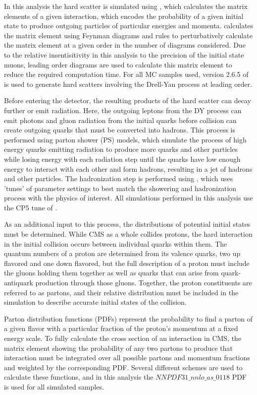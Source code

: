In this analysis the hard scatter is simulated using \mg, which calculates the matrix elements of a given interaction, which encodes the probability of a given initial state to produce outgoing particles of particular energies and momenta.
\mg calculates the matrix element using Feynman diagrams and rules to perturbatively calculate the matrix element at a given order in the number of diagrams considered.
Due to the relative insentisitivity in this analysis to the precision of the initial state muons, leading order diagrams are used to calculate this matrix element to reduce the required computation time.
For all MC samples used, version 2.6.5 of \mg is used to generate hard scatters involving the Drell-Yan process at leading order. 

Before entering the detector, the resulting products of the hard scatter can decay further or emit radiation.
Here, the outgoing leptons from the DY process can emit photons and gluon radiation from the initial quarks before collision can create outgoing quarks that must be converted into hadrons. 
This process is performed using parton shower (PS) models, which simulate the process of high energy quarks emitting radiation to produce more quarks and other particles while losing energy with each radiation step until the quarks have low enough energy to interact with each other and form hadrons, resulting in a jet of hadrons and other particles.
The hadronization step is performed using \pythia, which uses 'tunes' of parameter settings to best match the showering and hadronization process with the physics of interest. 
All simulations performed in this analysis use the CP5 tune of \pythia \cite{pythia_tune}. 

As an additional input to this process, the distributions of potential initial states must be determined.
While CMS as a whole collides protons, the hard interaction in the initial collision occurs between individual quarks within them.
The quantum numbers of a proton are determined from its valence quarks, two up flavored and one down flavored, but the full description of a proton must include the gluons holding them together as well as quarks that can arise from quark-antiquark production through those gluons. 
Together, the proton constituents are referred to as partons, and their relative distribution must be included in the simulation to describe accurate initial states of the collision.

Parton distribution functions (PDFs) represent the probability to find a parton of a given flavor with a particular fraction of the proton's momentum at a fixed energy scale.
To fully calculate the cross section of an interaction in CMS, the matrix element showing the probability of any two partons to produce that interaction must be integrated over all possible partons and momentum fractions and weighted by the corresponding PDF. 
Several different schemes are used to calculate these functions, and in this analysis the $NNPDF31\_nnlo\_as\_0118$ PDF \cite{nnpdf} is used for all simulated samples.

